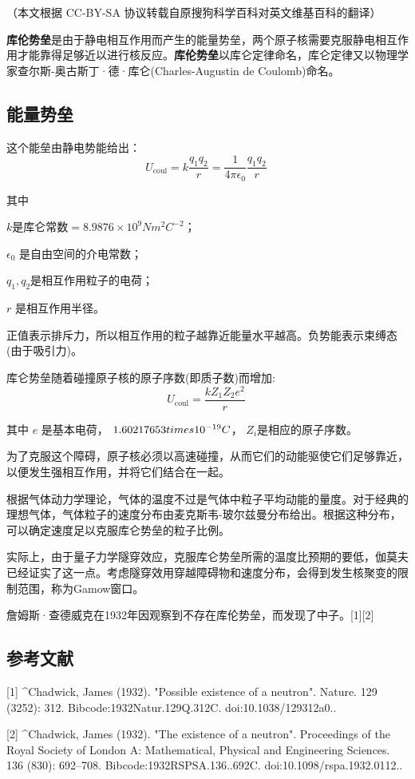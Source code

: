 
（本文根据 CC-BY-SA 协议转载自原搜狗科学百科对英文维基百科的翻译）

\textbf{库伦势垒}是由于静电相互作用而产生的能量势垒，两个原子核需要克服静电相互作用才能靠得足够近以进行核反应。\textbf{库伦势垒}以库仑定律命名，库仑定律又以物理学家查尔斯-奥古斯丁·德·库仑(Charles-Augustin de Coulomb)命名。

\subsection{能量势垒}
这个能垒由静电势能给出：
$$U_{\text{coul}} = k \frac{q_1 q_2}{r} = \frac{1}{4\pi\epsilon_0} \frac{q_1 q_2}{r}~$$

其中

$k\text{是库仑常数}= 8.9876\times10^9 N m^2 C^{-2}$；

$\epsilon_0$ 是自由空间的介电常数；

$q_1, q_2$是相互作用粒子的电荷；

$r$ 是相互作用半径。

正值表示排斥力，所以相互作用的粒子越靠近能量水平越高。负势能表示束缚态(由于吸引力)。

库仑势垒随着碰撞原子核的原子序数(即质子数)而增加:
\begin{equation}
U_{\text{coul}} = \frac{k Z_1 Z_2 e^2}{r}~
\end{equation}

其中 $e$ 是基本电荷， $1.602 \\ 176 \\ 53 \\times 10^{-19}C$， $Z_i $是相应的原子序数。

为了克服这个障碍，原子核必须以高速碰撞，从而它们的动能驱使它们足够靠近，以便发生强相互作用，并将它们结合在一起。

根据气体动力学理论，气体的温度不过是气体中粒子平均动能的量度。对于经典的理想气体，气体粒子的速度分布由麦克斯韦-玻尔兹曼分布给出。根据这种分布，可以确定速度足以克服库仑势垒的粒子比例。

实际上，由于量子力学隧穿效应，克服库仑势垒所需的温度比预期的要低，伽莫夫已经证实了这一点。考虑隧穿效用穿越障碍物和速度分布，会得到发生核聚变的限制范围，称为Gamow窗口。

詹姆斯·查德威克在1932年因观察到不存在库伦势垒，而发现了中子。[1][2]

\subsection{参考文献}
[1]
^Chadwick, James (1932). "Possible existence of a neutron". Nature. 129 (3252): 312. Bibcode:1932Natur.129Q.312C. doi:10.1038/129312a0..

[2]
^Chadwick, James (1932). "The existence of a neutron". Proceedings of the Royal Society of London A: Mathematical, Physical and Engineering Sciences. 136 (830): 692–708. Bibcode:1932RSPSA.136..692C. doi:10.1098/rspa.1932.0112..